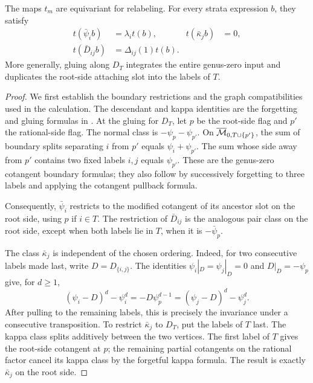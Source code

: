 \begin{lemma}
\label{lem:detector-operations}
The maps \(t_m\) are equivariant for relabeling.  For every
strata expression \(b\), they satisfy
\begin{align}
 t(\bar\psi_i b)&=\lambda_i t(b),
 &t(\bar\kappa_j b)&=0, \label{eq:detector-bars}\\
 t(\bar D_{ij}b)&=\Delta_{ij}(1)t(b). \label{eq:detector-pair}
\end{align}
More generally, gluing along \(D_T\) integrates the entire
genus-zero input and duplicates the root-side attaching slot
into the labels of \(T\).
\end{lemma}

\begin{proof}
We first establish the boundary restrictions and the graph
compatibilities used in the calculation. The descendant and kappa
identities are the forgetting and gluing formulas in
\cite[Equations~(1.7)--(1.10)]{ArbarelloCornalba1996}.  At the gluing for
\(D_T\), let \(p\) be the root-side flag and \(p'\) the
rational-side flag.  The normal class is
\(-\psi_p-\psi_{p'}\).  On
\(\overline{\mathcal M}_{0,T\cup\{p'\}}\), the sum of boundary splits separating
\(i\) from \(p'\) equals \(\psi_i+\psi_{p'}\).  The sum whose
side away from \(p'\) contains two fixed labels \(i,j\) equals
\(\psi_{p'}\).  These are the genus-zero cotangent boundary
formulas; they also follow by successively forgetting to three
labels and applying the cotangent pullback formula.

Consequently, \(\bar\psi_i\) restricts to the modified cotangent
of its ancestor slot on the root side, using \(p\) if \(i\in T\).
The restriction of \(\bar D_{ij}\) is the analogous pair class
on the root side, except when both labels lie in \(T\), when it
is \(-\bar\psi_p\).

The class \(\bar\kappa_j\) is independent of the chosen ordering.
Indeed, for two consecutive labels made last, write
\(D=D_{\{i,j\}}\).  The identities
\(\psi_i|_D=\psi_j|_D=0\) and
\(D|_D=-\psi_p\) give, for \(d\geq1\),
\begin{equation}
  (\psi_i-D)^d-\psi_i^d=-D\psi_p^{d-1}
  =(\psi_j-D)^d-\psi_j^d.
 \label{eq:detector-order}
\end{equation}
After pulling to the remaining labels, this is precisely the
invariance under a consecutive transposition.  To restrict
\(\bar\kappa_j\) to \(D_T\), put the labels of \(T\) last.
The kappa class splits additively between the two vertices.
The first label of \(T\) gives the root-side cotangent at \(p\);
the remaining partial cotangents on the rational factor cancel
its kappa class by the forgetful kappa formula.  The result is
exactly \(\bar\kappa_j\) on the root side.


\end{proof}
